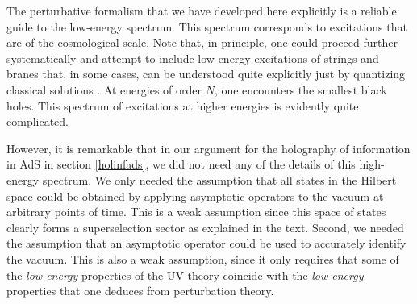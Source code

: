 \documentclass[12pt]{article}
\begin{document}
The perturbative formalism that we have developed here explicitly is a reliable guide to the low-energy spectrum. This spectrum corresponds to excitations that are of the cosmological scale.  Note that, in principle, one could proceed further systematically and attempt to include low-energy excitations of strings and branes that, in some cases, can be understood quite explicitly just by quantizing classical solutions \cite{Grant:2005qc,Mandal:2005wv,Maldacena:2000hw,mandal2008sgg,Ashok:2008fa}. At energies of order $N$, one encounters the smallest black holes.  This spectrum of excitations at higher energies is  evidently quite complicated. 

However, it is remarkable that in our argument for the holography of information in AdS in section \ref{holinfads}, we did not need any of the details of this high-energy spectrum. We only needed the assumption that all states in the Hilbert space could be obtained by applying asymptotic operators to the vacuum at arbitrary points of time. This is a weak assumption since this space of states clearly forms a superselection sector as explained in the text. Second, we needed the assumption that an asymptotic operator  could be used to accurately identify the vacuum. This is also a weak assumption, since it only requires that some of the {\em low-energy} properties of the UV theory coincide with the {\em low-energy} properties that one deduces from perturbation theory.



\end{document}
